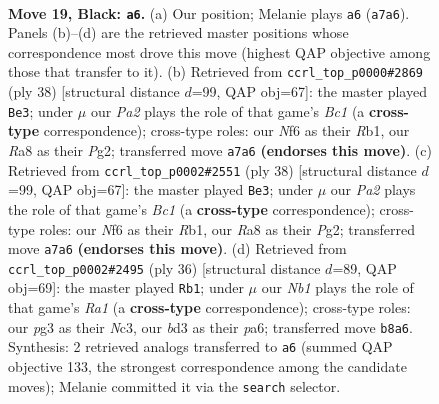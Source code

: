 \documentclass[11pt]{article}
\begin{document}
\clearpage

\begin{figure}[p]\centering
\begin{subfigure}{0.46\textwidth}\centering
\resizebox{\linewidth}{!}{%
\newchessgame
\chessboard[
  setfen={rnbq2k1/p1r2p2/1p3np1/1P1p2Np/P2P1P1P/R1NB2P1/3K4/3Q3R b - - 0 19},
  showmover=false,
  pgfstyle=straightmove, color=movearrow, markmove={a7-a6}
]}
\caption{}
\end{subfigure}\hfill
\begin{subfigure}{0.46\textwidth}\centering
\resizebox{\linewidth}{!}{%
\newchessgame
\chessboard[
  setfen={r3r1k1/1pqn1pp1/p1pb1n1p/P7/1P2P3/2N2N1P/2Q2PP1/1RBR2K1 w - - 0 20},
  showmover=false,
  pgfstyle=straightmove, color=movearrow, markmove={c1-e3}
]}
\caption{}
\end{subfigure}
\\[4pt]
\begin{subfigure}{0.46\textwidth}\centering
\resizebox{\linewidth}{!}{%
\newchessgame
\chessboard[
  setfen={r3r1k1/1pqn1pp1/p1pb1n1p/P7/1P2P3/2N2N1P/2Q2PP1/1RBR2K1 w - - 0 20},
  showmover=false,
  pgfstyle=straightmove, color=movearrow, markmove={c1-e3}
]}
\caption{}
\end{subfigure}\hfill
\begin{subfigure}{0.46\textwidth}\centering
\resizebox{\linewidth}{!}{%
\newchessgame
\chessboard[
  setfen={r3r1k1/1pqn1ppp/p1pb1n2/P7/1P2P3/2N2N1P/2Q2PP1/R1BR2K1 w - - 1 19},
  showmover=false,
  pgfstyle=straightmove, color=movearrow, markmove={a1-b1}
]}
\caption{}
\end{subfigure}
\caption{\textbf{Move 19, Black: \texttt{a6}.} (a) Our position; Melanie plays \texttt{a6} (\texttt{a7a6}). Panels (b)--(d) are the retrieved master positions whose correspondence most drove this move (highest QAP objective among those that transfer to it). (b) Retrieved from \texttt{ccrl\_top\_p0000\#2869} (ply 38) [structural distance $d$=99, QAP obj=67]: the master played \texttt{Be3}; under $\mu$ our \emph{Pa2} plays the role of that game's \emph{Bc1} (a \textbf{cross-type} correspondence); cross-type roles: our \emph{N}f6 as their \emph{R}b1, our \emph{R}a8 as their \emph{P}g2; transferred move \texttt{a7a6} \textbf{(endorses this move)}. (c) Retrieved from \texttt{ccrl\_top\_p0002\#2551} (ply 38) [structural distance $d$=99, QAP obj=67]: the master played \texttt{Be3}; under $\mu$ our \emph{Pa2} plays the role of that game's \emph{Bc1} (a \textbf{cross-type} correspondence); cross-type roles: our \emph{N}f6 as their \emph{R}b1, our \emph{R}a8 as their \emph{P}g2; transferred move \texttt{a7a6} \textbf{(endorses this move)}. (d) Retrieved from \texttt{ccrl\_top\_p0002\#2495} (ply 36) [structural distance $d$=89, QAP obj=69]: the master played \texttt{Rb1}; under $\mu$ our \emph{Nb1} plays the role of that game's \emph{Ra1} (a \textbf{cross-type} correspondence); cross-type roles: our \emph{p}g3 as their \emph{N}c3, our \emph{b}d3 as their \emph{p}a6; transferred move \texttt{b8a6}. Synthesis: 2 retrieved analogs transferred to \texttt{a6} (summed QAP objective 133, the strongest correspondence among the candidate moves); Melanie committed it via the \texttt{search} selector.}
\label{fig:thought-m37}
\end{figure}
\end{document}
